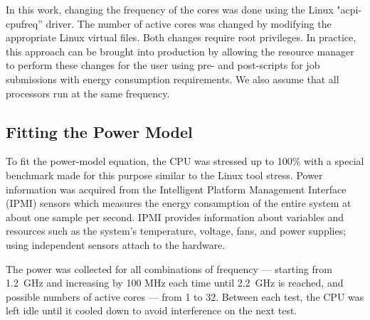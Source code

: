 In this work, changing the frequency of the cores was done using the Linux "acpi-cpufreq'' driver. The number of active cores was changed by modifying the appropriate Linux virtual files. Both changes require root privileges. In practice, this approach can be brought into production by allowing the resource manager to perform these changes for the user using pre- and post-scripts for job submissions with energy consumption requirements. We also assume that all processors run at the same frequency.


\subsection{Fitting the Power Model} \label{sec:powerfitting}
To fit the power-model equation, the CPU was stressed up to 100\% with a special benchmark made for this purpose similar to the Linux tool stress. Power information was acquired from the Intelligent Platform Management Interface (IPMI) sensors which measures the energy consumption of the entire system at about one sample per second. IPMI provides information about variables and resources such as the system's temperature, voltage, fans, and power supplies; using independent sensors attach to the hardware.




The power was collected for all combinations of frequency --- starting from 1.2~GHz and increasing by 100 MHz each time until 2.2~GHz is reached, and possible numbers of active cores --- from 1 to 32. Between each test, the CPU was left idle until it cooled down to avoid interference on the next test.

